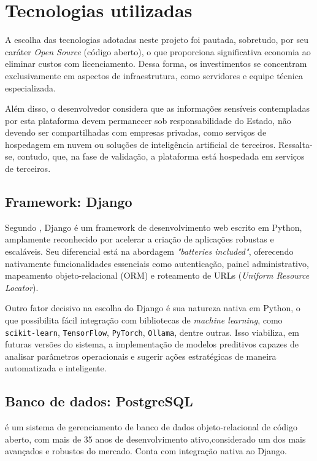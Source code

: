 \section{Tecnologias utilizadas}
\par A escolha das tecnologias adotadas neste projeto foi pautada, sobretudo, por seu caráter \textit{Open Source} (código aberto), o que proporciona significativa economia ao eliminar custos com licenciamento. Dessa forma, os investimentos se concentram exclusivamente em aspectos de infraestrutura, como servidores e equipe técnica especializada.
\par Além disso, o desenvolvedor considera que as informações sensíveis contempladas por esta plataforma devem permanecer sob responsabilidade do Estado, não devendo ser compartilhadas com empresas privadas, como serviços de hospedagem em nuvem ou soluções de inteligência artificial de terceiros. Ressalta-se, contudo, que, na fase de validação, a plataforma está hospedada em serviços de terceiros.

\subsection{Framework: Django}
\par Segundo , Django é um framework de desenvolvimento web escrito em Python, amplamente reconhecido por acelerar a criação de aplicações robustas e escaláveis. Seu diferencial está na abordagem \textit{"batteries included"}, oferecendo nativamente funcionalidades essenciais como autenticação, painel administrativo, mapeamento objeto-relacional (ORM) e roteamento de URLs (\textit{Uniform Resource Locator}).
\par Outro fator decisivo na escolha do Django é sua natureza nativa em Python, o que possibilita fácil integração com bibliotecas de \textit{machine learning}, como \texttt{scikit-learn}, \texttt{TensorFlow}, \texttt{PyTorch}, \texttt{Ollama}, dentre outras. Isso viabiliza, em futuras versões do sistema, a implementação de modelos preditivos capazes de analisar parâmetros operacionais e sugerir ações estratégicas de maneira automatizada e inteligente.

\subsection{Banco de dados: PostgreSQL}
\par {} é um sistema de gerenciamento de banco de dados objeto-relacional de código aberto, com mais de 35 anos de desenvolvimento ativo,considerado um dos mais avançados e robustos do mercado. Conta com integração nativa ao Django.

